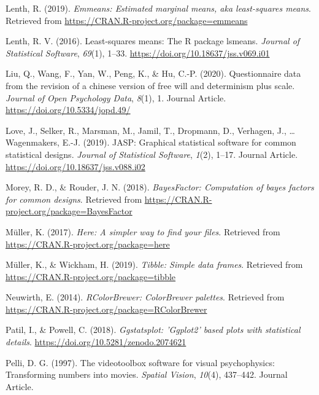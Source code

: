 \documentclass[man]{apa6}
\begin{document}
\leavevmode\hypertarget{ref-R-emmeans}{}%
Lenth, R. (2019). \emph{Emmeans: Estimated marginal means, aka least-squares means}. Retrieved from \url{https://CRAN.R-project.org/package=emmeans}

\leavevmode\hypertarget{ref-R-lsmeans}{}%
Lenth, R. V. (2016). Least-squares means: The R package lsmeans. \emph{Journal of Statistical Software}, \emph{69}(1), 1--33. \url{https://doi.org/10.18637/jss.v069.i01}

\leavevmode\hypertarget{ref-Liu_2020_JOPD}{}%
Liu, Q., Wang, F., Yan, W., Peng, K., \& Hu, C.-P. (2020). Questionnaire data from the revision of a chinese version of free will and determinism plus scale. \emph{Journal of Open Psychology Data}, \emph{8}(1), 1. Journal Article. \url{https://doi.org/10.5334/jopd.49/}

\leavevmode\hypertarget{ref-Love_etal_2019_JASP}{}%
Love, J., Selker, R., Marsman, M., Jamil, T., Dropmann, D., Verhagen, J., \ldots{} Wagenmakers, E.-J. (2019). JASP: Graphical statistical software for common statistical designs. \emph{Journal of Statistical Software}, \emph{1}(2), 1--17. Journal Article. \url{https://doi.org/10.18637/jss.v088.i02}

\leavevmode\hypertarget{ref-R-BayesFactor}{}%
Morey, R. D., \& Rouder, J. N. (2018). \emph{BayesFactor: Computation of bayes factors for common designs}. Retrieved from \url{https://CRAN.R-project.org/package=BayesFactor}

\leavevmode\hypertarget{ref-R-here}{}%
Müller, K. (2017). \emph{Here: A simpler way to find your files}. Retrieved from \url{https://CRAN.R-project.org/package=here}

\leavevmode\hypertarget{ref-R-tibble}{}%
Müller, K., \& Wickham, H. (2019). \emph{Tibble: Simple data frames}. Retrieved from \url{https://CRAN.R-project.org/package=tibble}

\leavevmode\hypertarget{ref-R-RColorBrewer}{}%
Neuwirth, E. (2014). \emph{RColorBrewer: ColorBrewer palettes}. Retrieved from \url{https://CRAN.R-project.org/package=RColorBrewer}

\leavevmode\hypertarget{ref-R-ggstatsplot}{}%
Patil, I., \& Powell, C. (2018). \emph{Ggstatsplot: 'Ggplot2' based plots with statistical details}. \url{https://doi.org/10.5281/zenodo.2074621}

\leavevmode\hypertarget{ref-Pelli_1997}{}%
Pelli, D. G. (1997). The videotoolbox software for visual psychophysics: Transforming numbers into movies. \emph{Spatial Vision}, \emph{10}(4), 437--442. Journal Article.
\end{document}
